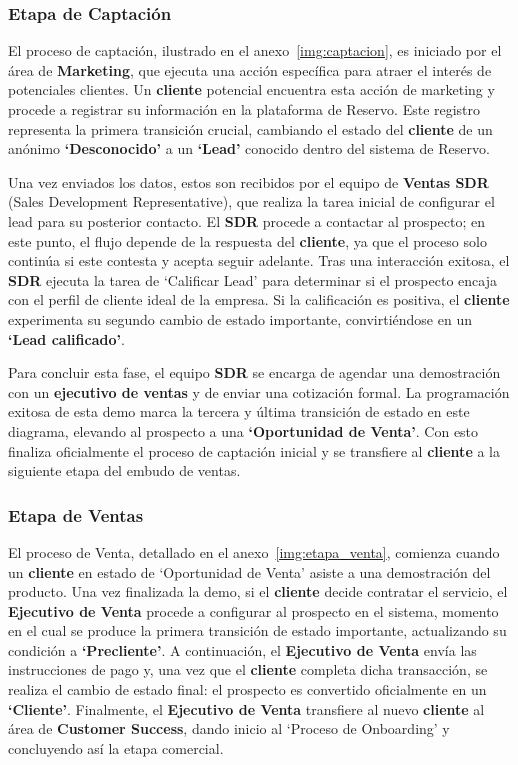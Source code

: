\subsubsection{Etapa de Captación}

El proceso de captación, ilustrado en el anexo~\ref{img:captacion}, es iniciado por el área de \textbf{Marketing}, que ejecuta una acción específica para atraer el interés de potenciales clientes. Un \textbf{cliente} potencial encuentra esta acción de marketing y procede a registrar su información en la plataforma de Reservo. Este registro representa la primera transición crucial, cambiando el estado del \textbf{cliente} de un anónimo \textbf{`Desconocido'} a un \textbf{`Lead'} conocido dentro del sistema de Reservo.

Una vez enviados los datos, estos son recibidos por el equipo de \textbf{Ventas SDR} (Sales Development Representative), que realiza la tarea inicial de configurar el lead para su posterior contacto. El \textbf{SDR} procede a contactar al prospecto; en este punto, el flujo depende de la respuesta del \textbf{cliente}, ya que el proceso solo continúa si este contesta y acepta seguir adelante. Tras una interacción exitosa, el \textbf{SDR} ejecuta la tarea de `Calificar Lead' para determinar si el prospecto encaja con el perfil de cliente ideal de la empresa. Si la calificación es positiva, el \textbf{cliente} experimenta su segundo cambio de estado importante, convirtiéndose en un \textbf{`Lead calificado'}.

Para concluir esta fase, el equipo \textbf{SDR} se encarga de agendar una demostración con un \textbf{ejecutivo de ventas} y de enviar una cotización formal. La programación exitosa de esta demo marca la tercera y última transición de estado en este diagrama, elevando al prospecto a una \textbf{`Oportunidad de Venta'}. Con esto finaliza oficialmente el proceso de captación inicial y se transfiere al \textbf{cliente} a la siguiente etapa del embudo de ventas.

\subsubsection{Etapa de Ventas}

El proceso de Venta, detallado en el anexo~\ref{img:etapa_venta}, comienza cuando un \textbf{cliente} en estado de `Oportunidad de Venta' asiste a una demostración del producto. Una vez finalizada la demo, si el \textbf{cliente} decide contratar el servicio, el \textbf{Ejecutivo de Venta} procede a configurar al prospecto en el sistema, momento en el cual se produce la primera transición de estado importante, actualizando su condición a \textbf{`Precliente'}. A continuación, el \textbf{Ejecutivo de Venta} envía las instrucciones de pago y, una vez que el \textbf{cliente} completa dicha transacción, se realiza el cambio de estado final: el prospecto es convertido oficialmente en un \textbf{`Cliente'}. Finalmente, el \textbf{Ejecutivo de Venta} transfiere al nuevo \textbf{cliente} al área de \textbf{Customer Success}, dando inicio al `Proceso de Onboarding' y concluyendo así la etapa comercial.

